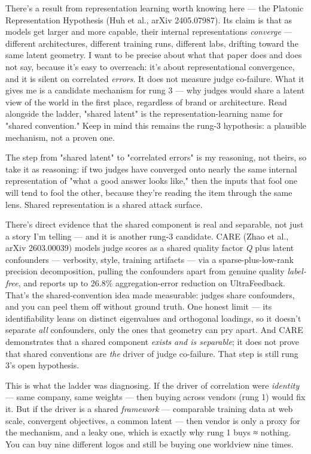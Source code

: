 \documentclass[11pt]{article}
\begin{document}
There's a result from representation learning worth knowing here — the Platonic Representation Hypothesis (Huh et al., arXiv 2405.07987). Its claim is that as models get larger and more capable, their internal representations \emph{converge} — different architectures, different training runs, different labs, drifting toward the same latent geometry. I want to be precise about what that paper does and does not say, because it's easy to overreach: it's about representational convergence, and it is silent on correlated \emph{errors}. It does not measure judge co-failure. What it gives me is a candidate mechanism for rung 3 — why judges would share a latent view of the world in the first place, regardless of brand or architecture. Read alongside the ladder, "shared latent" is the representation-learning name for "shared convention." Keep in mind this remains the rung-3 hypothesis: a plausible mechanism, not a proven one.

The step from "shared latent" to "correlated errors" is my reasoning, not theirs, so take it as reasoning: if two judges have converged onto nearly the same internal representation of "what a good answer looks like," then the inputs that fool one will tend to fool the other, because they're reading the item through the same lens. Shared representation is a shared attack surface.

There's direct evidence that the shared component is real and separable, not just a story I'm telling — and it is another rung-3 candidate. CARE (Zhao et al., arXiv 2603.00039) models judge scores as a shared quality factor \emph{Q} plus latent confounders — verbosity, style, training artifacts — via a sparse-plus-low-rank precision decomposition, pulling the confounders apart from genuine quality \emph{label-free}, and reports up to 26.8\% aggregation-error reduction on UltraFeedback. That's the shared-convention idea made measurable: judges share confounders, and you can peel them off without ground truth. One honest limit — its identifiability leans on distinct eigenvalues and orthogonal loadings, so it doesn't separate \emph{all} confounders, only the ones that geometry can pry apart. And CARE demonstrates that a shared component \emph{exists and is separable}; it does not prove that shared conventions are \emph{the} driver of judge co-failure. That step is still rung 3's open hypothesis.

This is what the ladder was diagnosing. If the driver of correlation were \emph{identity} — same company, same weights — then buying across vendors (rung 1) would fix it. But if the driver is a shared \emph{framework} — comparable training data at web scale, convergent objectives, a common latent — then vendor is only a proxy for the mechanism, and a leaky one, which is exactly why rung 1 buys ≈ nothing. You can buy nine different logos and still be buying one worldview nine times.
\end{document}
